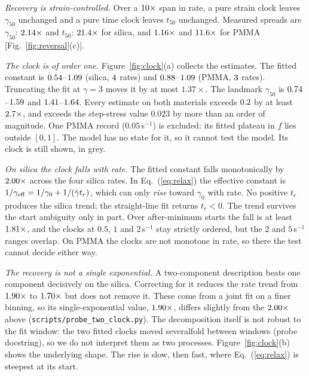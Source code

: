 \documentclass[aps,pre,reprint,superscriptaddress,nofootinbib]{revtex4-2}
\begin{document}
\emph{Recovery is strain-controlled.} Over a $10\times$ span in rate, a pure strain clock
leaves $\gamma_{50}$ unchanged and a pure time clock leaves $t_{50}$ unchanged.
Measured spreads are $\gamma_{50}$: $2.14\times$ and $t_{50}$: $21.4\times$
for silica, and $1.16\times$ and $11.6\times$ for PMMA [Fig.~\ref{fig:reversal}(c)].

\emph{The clock is of order one.} Figure~\ref{fig:clock}(a) collects the estimates. The fitted
constant is $0.54$--$1.09$ (silica, $4$ rates) and $0.88$--$1.09$
(PMMA, $3$ rates). Truncating the fit at $\gamma=3$ moves it by at most $1.37\times$.  %
The landmark $\gamma_{50}$ is $0.74$--$1.59$ and $1.41$--$1.64$. Every estimate on
both materials exceeds $0.2$ by at least $2.7\times$, and exceeds the
step-stress value $0.023$ by more than an order of magnitude. One PMMA record
($0.05$\,s$^{-1}$) is excluded: its fitted plateau in $f$ lies outside $[0,1]$. The model
has no state for it, so it cannot test the model. Its clock is still shown, in grey.

\emph{On silica the clock falls with rate.} The fitted constant falls monotonically by
$2.00\times$ across the four silica rates. In Eq.~(\ref{eq:relax}) the effective
constant is $1/\gamma_{\rm eff}=1/\gamma_0+1/(\dot\gamma t_r)$, which can only \emph{rise}
toward $\gamma_0$ with rate. No positive $t_r$ produces the silica trend; the straight-line
fit returns $t_r<0$. The trend survives the start ambiguity only in part. Over after-minimum starts the fall is at least $1.81\times$, and the clocks at $0.5$, $1$ and $2$\,s$^{-1}$ stay strictly ordered, but the $2$ and $5$\,s$^{-1}$ ranges overlap. On PMMA the clocks are not monotone in rate, so there the test
cannot decide either way.

\emph{The recovery is not a single exponential.} A two-component description beats one
component decisively on the silica. Correcting for it reduces the rate trend from
$1.90\times$ to $1.70\times$ but does not remove it. These come from a joint fit on a finer binning, so its single-exponential value, $1.90\times$, differs slightly from the $2.00\times$ above
(\texttt{scripts/probe\_two\_clock.py}). The decomposition itself is not robust to the fit window: the two
fitted clocks moved severalfold between windows (probe docstring), so we do not interpret them as two processes. Figure~\ref{fig:clock}(b) shows the
underlying shape. The rise is slow, then fast, where Eq.~(\ref{eq:relax}) is steepest at its
start.
\end{document}
